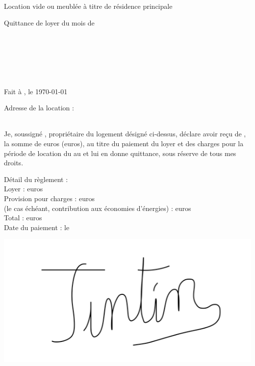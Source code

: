 \documentclass[12pt,a4paper]{article}
\begin{document}
\thispagestyle{empty}

\begin{center}
Location vide ou meublée à titre de résidence principale\\
\begin{LARGE}
Quittance de loyer du mois de \nommois\space\annee
\end{LARGE}
\end{center}
\bigskip

\begin{flushleft}
\nomproprio\\
\adresseproprio\\
\villeproprio
\end{flushleft}

\medskip

\begin{flushright}
\nomlocataire\\
\adresselocataire\\
\villelocataire
\end{flushright}

\medskip

\begin{flushright}
Fait à \lieudocument, le \today
\end{flushright}

\medskip

\begin{flushleft}
Adresse de la location :\\
\adresselocation\\
\villelocation
\end{flushleft}

\medskip

\begin{flushleft}
Je, soussigné \nomproprio, propriétaire du logement désigné ci-dessus, déclare avoir reçu
de \nomlocataire, la somme de \loyerchiffres\space euros (\loyerlettres\space euros), au titre
du paiement du loyer et des charges pour la période de location du \debutmois\space au
\finmois\space et lui en donne quittance, sous réserve de tous mes droits.
\end{flushleft}

\medskip

\begin{flushleft}
Détail du règlement :\\
Loyer : \loyerchiffres\space euros\\
Provision pour charges : \charges\space euros\\
(le cas échéant, contribution aux économies d’énergies) : \economisenergies\space euros\\
Total : \totalpaiement\space euros\\
Date du paiement : le \datepaiement
\end{flushleft}

\medskip

\begin{center}
\includegraphics[width=0.3\linewidth]{Signature.PNG}
\end{center}
\end{document}
